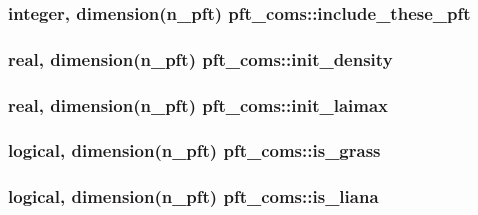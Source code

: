 \subsubsection[{include\+\_\+these\+\_\+pft}]{\setlength{\rightskip}{0pt plus 5cm}integer, dimension(n\+\_\+pft) pft\+\_\+coms\+::include\+\_\+these\+\_\+pft}\label{namespacepft__coms_a7ab2f215846d8f15e70deeb77fa8802e}
\hypertarget{namespacepft__coms_aad950f9e3b7c51796f0c72acbf85198d}{}
\subsubsection[{init\+\_\+density}]{\setlength{\rightskip}{0pt plus 5cm}real, dimension(n\+\_\+pft) pft\+\_\+coms\+::init\+\_\+density}\label{namespacepft__coms_aad950f9e3b7c51796f0c72acbf85198d}
\hypertarget{namespacepft__coms_aee1c14f39841cdf40c9655ae6eab2e85}{}
\subsubsection[{init\+\_\+laimax}]{\setlength{\rightskip}{0pt plus 5cm}real, dimension(n\+\_\+pft) pft\+\_\+coms\+::init\+\_\+laimax}\label{namespacepft__coms_aee1c14f39841cdf40c9655ae6eab2e85}
\hypertarget{namespacepft__coms_a74313e4ba2eb3134ae662a573ee862e4}{}
\subsubsection[{is\+\_\+grass}]{\setlength{\rightskip}{0pt plus 5cm}logical, dimension(n\+\_\+pft) pft\+\_\+coms\+::is\+\_\+grass}\label{namespacepft__coms_a74313e4ba2eb3134ae662a573ee862e4}
\hypertarget{namespacepft__coms_a72d72373c3e4e66defb4dc9923258e42}{}
\subsubsection[{is\+\_\+liana}]{\setlength{\rightskip}{0pt plus 5cm}logical, dimension(n\+\_\+pft) pft\+\_\+coms\+::is\+\_\+liana}\label{namespacepft__coms_a72d72373c3e4e66defb4dc9923258e42}
\hypertarget{namespacepft__coms_ae26d357a418f5441d136c81e335cd633}{}
